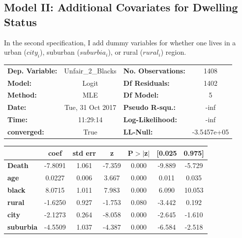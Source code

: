\documentclass{article}
\begin{document}
\subsection{Model II: Additional Covariates for Dwelling Status}
In the second specification, I add dummy variables for whether one lives in a urban ($city_{i}$), suburban ($suburbia_{i}$), or rural ($rural_{i}$) region. 

\bigskip

\begin{tabular}{lclc}
\toprule
\textbf{Dep. Variable:} & Unfair\_2\_Blacks  & \textbf{  No. Observations:  } &      1408    \\
\textbf{Model:}         &      Logit       & \textbf{  Df Residuals:      } &      1402    \\
\textbf{Method:}        &       MLE        & \textbf{  Df Model:          } &         5    \\
\textbf{Date:}          & Tue, 31 Oct 2017 & \textbf{  Pseudo R-squ.:     } &      -inf    \\
\textbf{Time:}          &     11:29:14     & \textbf{  Log-Likelihood:    } &       -inf   \\
\textbf{converged:}     &       True       & \textbf{  LL-Null:           } & -3.5457e+05  \\
\bottomrule
\end{tabular}
\begin{tabular}{lcccccc}
                  & \textbf{coef} & \textbf{std err} & \textbf{z} & \textbf{P$>$$|$z$|$} & \textbf{[0.025} & \textbf{0.975]}  \\
\midrule
\textbf{Death}    &      -7.8091  &        1.061     &    -7.359  &         0.000        &       -9.889    &       -5.729     \\
\textbf{age}      &       0.0227  &        0.006     &     3.667  &         0.000        &        0.011    &        0.035     \\
\textbf{black}    &       8.0715  &        1.011     &     7.983  &         0.000        &        6.090    &       10.053     \\
\textbf{rural}    &      -1.6250  &        0.927     &    -1.753  &         0.080        &       -3.442    &        0.192     \\
\textbf{city}     &      -2.1273  &        0.264     &    -8.058  &         0.000        &       -2.645    &       -1.610     \\
\textbf{suburbia} &      -4.5509  &        1.037     &    -4.387  &         0.000        &       -6.584    &       -2.518     \\
\bottomrule
\end{tabular}
\end{document}
